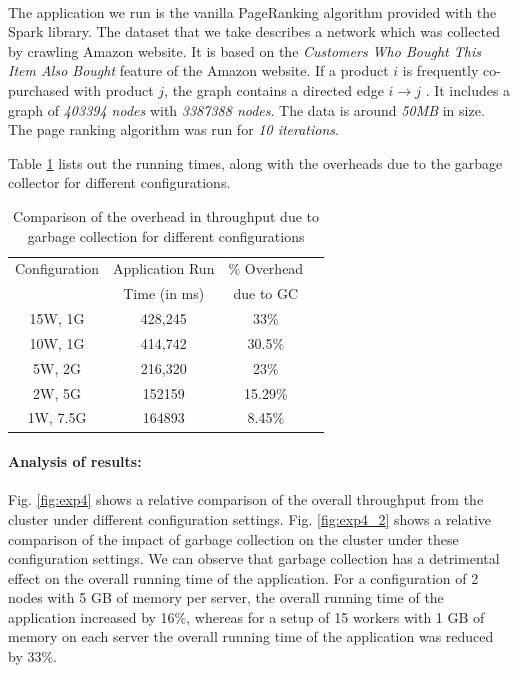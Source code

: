 \paragraph{}
The application we run is the vanilla PageRanking algorithm provided
with the Spark library. The dataset that we take describes a network
which was collected by crawling Amazon website. It is based on the
\textit{Customers Who Bought This Item Also Bought} feature of the
Amazon website. If a product $i$ is frequently co-purchased with product
$j$, the graph contains a directed edge $i \rightarrow j$
\cite{leskovec}. It includes a graph of \textit{403394 nodes} with
\textit{3387388 nodes}. The data is around \textit{50MB} in size. The
page ranking algorithm was run for \textit{10 iterations}.

Table \ref{tab:table1} lists out the running times, along with the
overheads due to the garbage collector for different configurations.

\begin{table}[h!]
\begin{tabular}{| c | c | c | c |}
\hline
Configuration  & Application Run  &  \% Overhead  \\ 
& Time (in ms) & due to GC \\ \hline
15W, 1G & 428,245  & 33\% \\ \hline
10W, 1G & 414,742 &  30.5\% \\ \hline
5W, 2G & 216,320 & 23\%  \\ \hline
2W, 5G & 152159 & 15.29\% \\ \hline
1W, 7.5G & 164893 & 8.45\% \\ \hline
\end{tabular}
\caption{Comparison of the overhead in throughput due to garbage collection for different configurations}
\label{tab:table1}
\end{table}

\paragraph{Analysis of results:}
Fig. \ref{fig:exp4} shows a relative comparison of the overall
throughput from the cluster under different configuration settings. Fig.
\ref{fig:exp4_2} shows a relative comparison of the impact of garbage
collection on the cluster under these configuration settings. We can
observe that garbage collection has a detrimental effect on the overall
running time of the application. For a configuration of 2 nodes with 5
GB of memory per server, the overall running time of the application
increased by 16\%, whereas for a setup of 15 workers with 1 GB of memory
on each server the overall running time of the application was reduced
by 33\%. 

